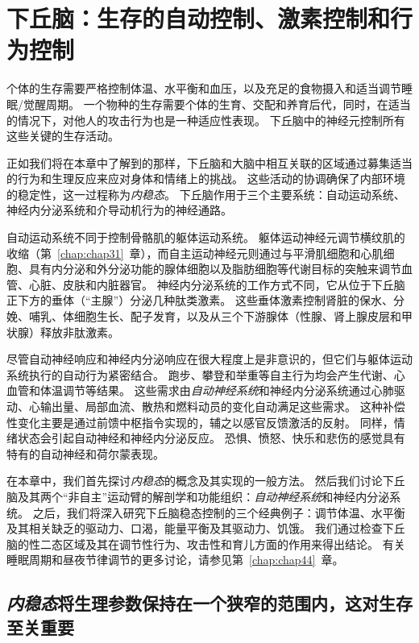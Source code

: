 \chapter{下丘脑：生存的自动控制、激素控制和行为控制} \label{chap:chap41}

个体的生存需要严格控制体温、水平衡和血压，以及充足的食物摄入和适当调节睡眠/觉醒周期。
一个物种的生存需要个体的生育、交配和养育后代，同时，在适当的情况下，对他人的攻击行为也是一种适应性表现。
下丘脑中的神经元控制所有这些关键的生存活动。


正如我们将在本章中了解到的那样，下丘脑和大脑中相互关联的区域通过募集适当的行为和生理反应来应对身体和情绪上的挑战。
这些活动的协调确保了内部环境的稳定性，这一过程称为\textit{内稳态}。
下丘脑作用于三个主要系统：自动运动系统、神经内分泌系统和介导动机行为的神经通路。


自动运动系统不同于控制骨骼肌的躯体运动系统。
躯体运动神经元调节横纹肌的收缩（第~\ref{chap:chap31}~章），而自主运动神经元则通过与平滑肌细胞和心肌细胞、具有内分泌和外分泌功能的腺体细胞以及脂肪细胞等代谢目标的突触来调节血管、心脏、皮肤和内脏器官。
神经内分泌系统的工作方式不同，它从位于下丘脑正下方的垂体（“主腺”）分泌几种肽类激素。
这些垂体激素控制肾脏的保水、分娩、哺乳、体细胞生长、配子发育，以及从三个下游腺体（性腺、肾上腺皮层和甲状腺）释放非肽激素。


尽管自动神经响应和神经内分泌响应在很大程度上是非意识的，但它们与躯体运动系统执行的自动行为紧密结合。
跑步、攀登和举重等自主行为均会产生代谢、心血管和体温调节等结果。
这些需求由\textit{自动神经系统}和神经内分泌系统通过心肺驱动、心输出量、局部血流、散热和燃料动员的变化自动满足这些需求。
这种补偿性变化主要是通过前馈中枢指令实现的，辅之以感官反馈激活的反射。
同样，情绪状态会引起自动神经和神经内分泌反应。
恐惧、愤怒、快乐和悲伤的感觉具有特有的自动神经和荷尔蒙表现。


在本章中，我们首先探讨\textit{内稳态}的概念及其实现的一般方法。
然后我们讨论下丘脑及其两个“非自主”运动臂的解剖学和功能组织：\textit{自动神经系统}和神经内分泌系统。
之后，我们将深入研究下丘脑稳态控制的三个经典例子：调节体温、水平衡及其相关缺乏的驱动力、口渴，能量平衡及其驱动力、饥饿。
我们通过检查下丘脑的性二态区域及其在调节性行为、攻击性和育儿方面的作用来得出结论。
有关睡眠周期和昼夜节律调节的更多讨论，请参见第~\ref{chap:chap44}~章。



\section{\textit{内稳态}将生理参数保持在一个狭窄的范围内，这对生存至关重要}

